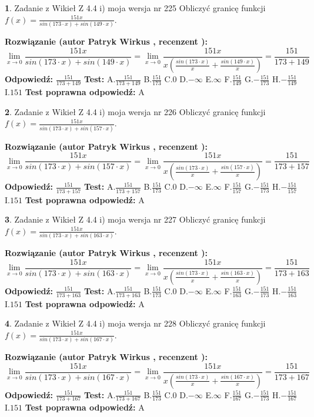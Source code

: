 \documentclass[12pt, a4paper]{article}
\theoremstyle{definition} %
\newtheorem{zad}{}
\newcommand{\zadStart}[1]{\begin{zad}#1\newline}
\newcommand{\zadStop}{\end{zad}}
\newcommand{\rozwStart}[2]{\noindent \textbf{Rozwiązanie (autor #1 , recenzent #2): }\newline}
\newcommand{\rozwStop}{\newline}
\newcommand{\odpStart}{\noindent \textbf{Odpowiedź:}\newline}
\newcommand{\odpStop}{\newline}
\newcommand{\testStart}{\noindent \textbf{Test:}\newline}
\newcommand{\testStop}{\newline}
\newcommand{\kluczStart}{\noindent \textbf{Test poprawna odpowiedź:}\newline}
\newcommand{\kluczStop}{\newline}
\begin{document}
\zadStart{Zadanie z Wikieł Z 4.4 i) moja wersja nr 225}
Obliczyć granicę funkcji $f(x)=\frac{151x}{sin(173\cdot x) +sin(149\cdot x)}$.
\zadStop
\rozwStart{Patryk Wirkus}{}
$$\lim\limits_{x\to 0}\frac{151x}{sin(173\cdot x) +sin(149\cdot x)}=\lim\limits_{x\to 0}\frac{151x}{x(\frac{sin(173\cdot x)}{x}+\frac{sin(149\cdot x)}{x})}=\frac{151}{173+149}$$
\rozwStop
\odpStart
$\frac{151}{173+149}$
\odpStop
\testStart
A.$\frac{151}{173+149}$
B.$\frac{151}{173}$
C.$0$
D.$-\infty$
E.$\infty$
F.$\frac{151}{149}$
G.$-\frac{151}{173}$
H.$-\frac{151}{149}$
I.$151$
\testStop
\kluczStart
A
\kluczStop



\zadStart{Zadanie z Wikieł Z 4.4 i) moja wersja nr 226}
Obliczyć granicę funkcji $f(x)=\frac{151x}{sin(173\cdot x) +sin(157\cdot x)}$.
\zadStop
\rozwStart{Patryk Wirkus}{}
$$\lim\limits_{x\to 0}\frac{151x}{sin(173\cdot x) +sin(157\cdot x)}=\lim\limits_{x\to 0}\frac{151x}{x(\frac{sin(173\cdot x)}{x}+\frac{sin(157\cdot x)}{x})}=\frac{151}{173+157}$$
\rozwStop
\odpStart
$\frac{151}{173+157}$
\odpStop
\testStart
A.$\frac{151}{173+157}$
B.$\frac{151}{173}$
C.$0$
D.$-\infty$
E.$\infty$
F.$\frac{151}{157}$
G.$-\frac{151}{173}$
H.$-\frac{151}{157}$
I.$151$
\testStop
\kluczStart
A
\kluczStop



\zadStart{Zadanie z Wikieł Z 4.4 i) moja wersja nr 227}
Obliczyć granicę funkcji $f(x)=\frac{151x}{sin(173\cdot x) +sin(163\cdot x)}$.
\zadStop
\rozwStart{Patryk Wirkus}{}
$$\lim\limits_{x\to 0}\frac{151x}{sin(173\cdot x) +sin(163\cdot x)}=\lim\limits_{x\to 0}\frac{151x}{x(\frac{sin(173\cdot x)}{x}+\frac{sin(163\cdot x)}{x})}=\frac{151}{173+163}$$
\rozwStop
\odpStart
$\frac{151}{173+163}$
\odpStop
\testStart
A.$\frac{151}{173+163}$
B.$\frac{151}{173}$
C.$0$
D.$-\infty$
E.$\infty$
F.$\frac{151}{163}$
G.$-\frac{151}{173}$
H.$-\frac{151}{163}$
I.$151$
\testStop
\kluczStart
A
\kluczStop



\zadStart{Zadanie z Wikieł Z 4.4 i) moja wersja nr 228}
Obliczyć granicę funkcji $f(x)=\frac{151x}{sin(173\cdot x) +sin(167\cdot x)}$.
\zadStop
\rozwStart{Patryk Wirkus}{}
$$\lim\limits_{x\to 0}\frac{151x}{sin(173\cdot x) +sin(167\cdot x)}=\lim\limits_{x\to 0}\frac{151x}{x(\frac{sin(173\cdot x)}{x}+\frac{sin(167\cdot x)}{x})}=\frac{151}{173+167}$$
\rozwStop
\odpStart
$\frac{151}{173+167}$
\odpStop
\testStart
A.$\frac{151}{173+167}$
B.$\frac{151}{173}$
C.$0$
D.$-\infty$
E.$\infty$
F.$\frac{151}{167}$
G.$-\frac{151}{173}$
H.$-\frac{151}{167}$
I.$151$
\testStop
\kluczStart
A
\kluczStop
\end{document}
